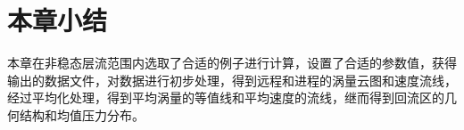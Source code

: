 \section{本章小结}

本章在非稳态层流范围内选取了合适的例子进行计算，设置了合适的参数值，获得输出的数据文件，对数据进行初步处理，得到远程和进程的涡量云图和速度流线，经过平均化处理，得到平均涡量的等值线和平均速度的流线，继而得到回流区的几何结构和均值压力分布。

